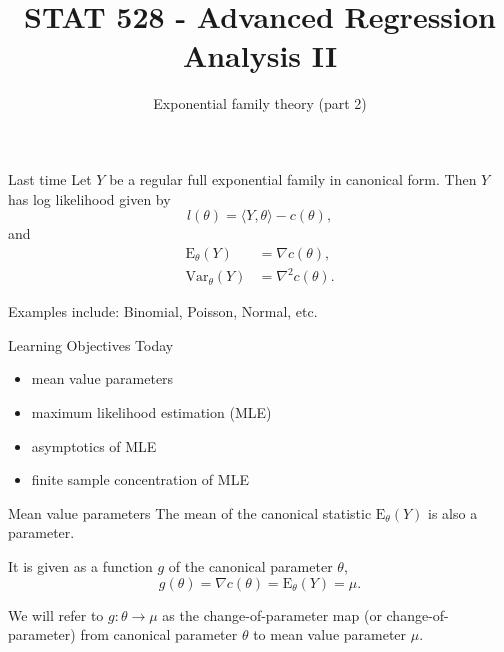\documentclass[
  ignorenonframetext,
]{beamer}
\title{STAT 528 - Advanced Regression Analysis II}
\author{Exponential family theory (part 2)}
\date{}
\institute{Daniel J. Eck\\
Department of Statistics\\
University of Illinois}
\providecommand{\tightlist}{%
  \setlength{\itemsep}{0pt}\setlength{\parskip}{0pt}}
\begin{document}
\frame{\titlepage}

\begin{frame}
\newcommand{\R}{\mathbb{R}}
\newcommand{\Prob}{\mathbb{P}}
\newcommand{\Proj}{\textbf{P}}
\newcommand{\Hcal}{\mathcal{H}}
\newcommand{\rootn}{\sqrt{n}}
\newcommand{\p}{\mathbf{p}}
\newcommand{\E}{\text{E}}
\newcommand{\Var}{\text{Var}}
\newcommand{\Cov}{\text{Cov}}

\newtheorem{cor}{Corollary}
\newtheorem{lem}{Lemma}
\newtheorem{thm}{Theorem}
\newtheorem{defn}{Definition}
\newtheorem{prop}{Proposition}
\end{frame}

\begin{frame}{Last time}
\protect\hypertarget{last-time}{}
Let \(Y\) be a regular full exponential family in canonical form. Then
\(Y\) has log likelihood given by \[
  l(\theta) = \langle Y,\theta \rangle - c(\theta),
\] and \begin{align*} 
    \text{E}_\theta(Y) &= \nabla c(\theta),  \\
    \text{Var}_\theta(Y) &= \nabla^2 c(\theta).   
\end{align*}

Examples include: Binomial, Poisson, Normal, etc.
\end{frame}

\begin{frame}{Learning Objectives Today}
\protect\hypertarget{learning-objectives-today}{}
\begin{itemize}
\tightlist
\item
  mean value parameters
\item
  maximum likelihood estimation (MLE)
\item
  asymptotics of MLE
\item
  finite sample concentration of MLE
\end{itemize}
\end{frame}

\begin{frame}{Mean value parameters}
\protect\hypertarget{mean-value-parameters}{}
The mean of the canonical statistic \(\text{E}_\theta(Y)\) is also a
parameter.

It is given as a function \(g\) of the canonical parameter \(\theta\),
\begin{equation} \label{mvp}
  g(\theta) = \nabla c(\theta) = \text{E}_\theta(Y) = \mu.    
\end{equation}

We will refer to \(g:\theta\to\mu\) as the change-of-parameter map (or
change-of-parameter) from canonical parameter \(\theta\) to mean value
parameter \(\mu\).
\end{frame}
\end{document}
